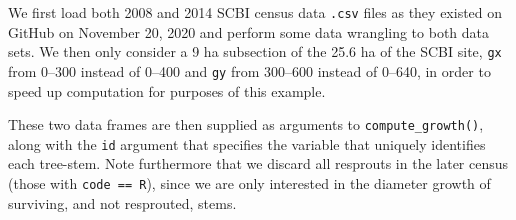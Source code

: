 \documentclass[12pt]{article}
\newenvironment{Shaded}{\begin{snugshade}}{\end{snugshade}}
\newcommand{\CommentTok}[1]{\textcolor[rgb]{0.56,0.35,0.01}{\textit{#1}}}
\newcommand{\DataTypeTok}[1]{\textcolor[rgb]{0.13,0.29,0.53}{#1}}
\newcommand{\DecValTok}[1]{\textcolor[rgb]{0.00,0.00,0.81}{#1}}
\newcommand{\KeywordTok}[1]{\textcolor[rgb]{0.13,0.29,0.53}{\textbf{#1}}}
\newcommand{\NormalTok}[1]{#1}
\newcommand{\OperatorTok}[1]{\textcolor[rgb]{0.81,0.36,0.00}{\textbf{#1}}}
\newcommand{\StringTok}[1]{\textcolor[rgb]{0.31,0.60,0.02}{#1}}
\begin{document}
We first load both 2008 and 2014 SCBI census data \texttt{.csv} files as
they existed on GitHub on November 20, 2020
\citep{gonzalez-akre_scbi-forestgeoscbi-forestgeo-data_2020} and perform
some data wrangling to both data sets. We then only consider a 9 ha
subsection of the 25.6 ha of the SCBI site, \texttt{gx} from 0--300
instead of 0--400 and \texttt{gy} from 300--600 instead of 0--640, in
order to speed up computation for purposes of this example.

\begin{Shaded}
\end{Shaded}

These two data frames are then supplied as arguments to
\texttt{compute\_growth()}, along with the \texttt{id} argument that
specifies the variable that uniquely identifies each tree-stem. Note
furthermore that we discard all resprouts in the later census (those
with \texttt{code\ ==\ R}), since we are only interested in the diameter
growth of surviving, and not resprouted, stems.
\end{document}
